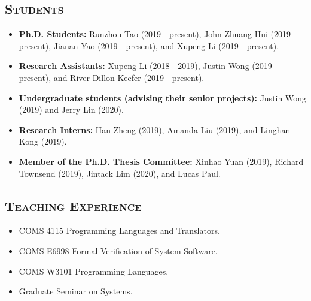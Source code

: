 \documentclass[10pt]{article}
\renewcommand{\section}[1]{
	\vspace{-5pt}
   	\subsection*{\scshape  \bfseries #1}
   }
\newenvironment{innerlist}[1][\enskip\textbullet]%
        {\begin{itemize}[#1,leftmargin=25pt,parsep=0pt,itemsep=2pt,topsep=2pt,partopsep=0pt]}
        {\end{itemize}}
\begin{document}
\section{Students}
\begin{innerlist}

\item[] \textbf{Ph.D. Students:} Runzhou Tao (2019 - present), John Zhuang Hui (2019 - present), Jianan Yao (2019 - present), and Xupeng Li (2019 - present).

\vspace{0.1in}


\item[] \textbf{Research Assistants:} Xupeng Li (2018 - 2019), Justin Wong (2019 - present), and River Dillon Keefer (2019 - present).



\vspace{0.1in}

\item[] \textbf{Undergraduate students (advising their senior projects):} 
Justin Wong (2019)
and Jerry Lin (2020).

\vspace{0.1in}

\item[] \textbf{Research Interns:}
Han Zheng (2019),
Amanda Liu (2019),
and Linghan Kong (2019).

\vspace{0.1in}

\item[] \textbf{Member of the Ph.D. Thesis Committee:} 
Xinhao Yuan (2019),
Richard Townsend (2019),
Jintack Lim (2020),
and Lucas Paul.

\end{innerlist}

\section{Teaching Experience}
\begin{innerlist}
\item[] COMS 4115 Programming Languages and Translators.
\vspace{0.05in}

\item[] COMS E6998 
Formal Verification of System Software.
\vspace{0.05in}

\item[] COMS W3101 
Programming Languages.
\vspace{0.05in}

\item[] Graduate Seminar on Systems.
\end{innerlist}
\end{document}
